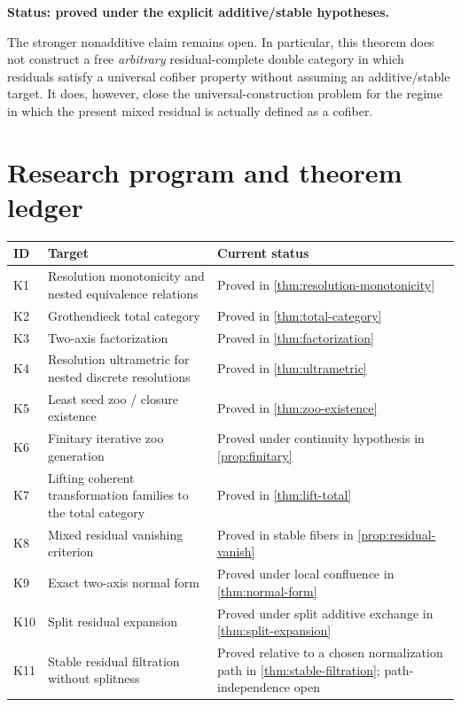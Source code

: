 \documentclass[11pt]{article}
\theoremstyle{definition}
\theoremstyle{remark}
\newcommand{\status}[1]{\textbf{Status: #1.}}
\begin{document}
\status{proved under the explicit additive/stable hypotheses}

The stronger nonadditive claim remains open. In particular, this theorem does not construct a free \emph{arbitrary} residual-complete double category in which residuals satisfy a universal cofiber property without assuming an additive/stable target. It does, however, close the universal-construction problem for the regime in which the present mixed residual is actually defined as a cofiber.


\section{Research program and theorem ledger}

\begin{longtable}{>{\raggedright\arraybackslash}p{} >{\raggedright\arraybackslash}p{} >{\raggedright\arraybackslash}p{}}
\toprule
ID & Target & Current status\\
\midrule
\endhead
K1 & Resolution monotonicity and nested equivalence relations & Proved in \cref{thm:resolution-monotonicity}\\
K2 & Grothendieck total category & Proved in \cref{thm:total-category}\\
K3 & Two-axis factorization & Proved in \cref{thm:factorization}\\
K4 & Resolution ultrametric for nested discrete resolutions & Proved in \cref{thm:ultrametric}\\
K5 & Least seed zoo / closure existence & Proved in \cref{thm:zoo-existence}\\
K6 & Finitary iterative zoo generation & Proved under continuity hypothesis in \cref{prop:finitary}\\
K7 & Lifting coherent transformation families to the total category & Proved in \cref{thm:lift-total}\\
K8 & Mixed residual vanishing criterion & Proved in stable fibers in \cref{prop:residual-vanish}\\
K9 & Exact two-axis normal form & Proved under local confluence in \cref{thm:normal-form}\\
K10 & Split residual expansion & Proved under split additive exchange in \cref{thm:split-expansion}\\
K11 & Stable residual filtration without splitness & Proved relative to a chosen normalization path in \cref{thm:stable-filtration}; path-independence open\\

\end{longtable}
\end{document}
